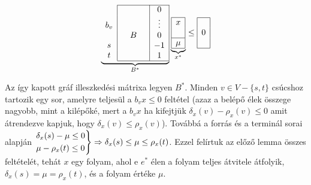 \begin{wrapfigure}{l}{0.35\textwidth}
	\begin{center}
		\vspace{-1.3cm}
		\begin{displaymath}
			\underbrace{
				\begin{array}{c|ccc|c|}
					\cline{2-5}
					    &  &   &  & 0      \\
					b_v &  &   &  & \vdots \\
					    &  & B &  & 0      \\
					s   &  &   &  & -1     \\
					t   &  &   &  & 1      \\
					\cline{2-5}
				\end{array}}_{B^*}
			\underbrace{
				\begin{array}{|c|}
					\hline
					x   \\
					\\
					\hline
					\mu \\
					\hline
				\end{array}}_{x^*}
			\leq
			\begin{array}{|c|}
				\hline
				\\
				0 \\
				\\
				\hline
			\end{array}
		\end{displaymath}
		\vspace{-1.3cm}
	\end{center}
\end{wrapfigure}
Az így kapott gráf illeszkedési mátrixa legyen $B^*$. Minden $v \in V - \{s,t\}$
csúcshoz tartozik egy sor, amelyre teljesül a $b_vx\leq 0$ feltétel (azaz a
belépő élek összege nagyobb, mint a kilépőké, mert a $b_vx$ ha kifejtjük
$\delta_x(v) - \rho_x(v) \leq 0 $ amit átrendezve kapjuk, hogy $ \delta_x(v)
	\leq \rho_x(v)$).
Továbbá a forrás és a terminál sorai alapján $\begin{rcases} \delta_x(s)-\mu
		\leq 0 \\
		\mu - \rho_x(t) \leq 0\end{rcases} \Rightarrow \delta_x(s) \leq \mu \leq
	\rho_x(t)$. Ezzel felírtuk az előző lemma összes feltételét, tehát $x$ egy
folyam, ahol e $e^*$ élen a folyam teljes átvitele átfolyik,
$\delta_x(s)=\mu=\rho_x(t)$, és a folyam értéke $\mu$.

